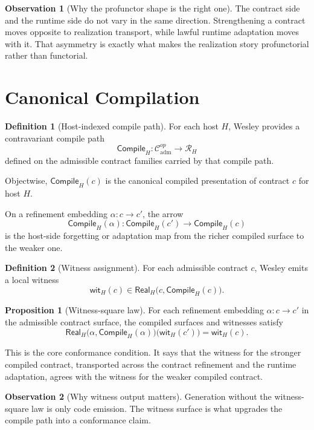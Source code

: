 \documentclass[11pt]{article}
\newcommand{\Ctr}{\mathcal{C}}
\newcommand{\RHost}[1]{\mathcal{R}_{#1}}
\newcommand{\Compile}{\mathsf{Compile}}
\newcommand{\Real}{\mathsf{Real}}
\theoremstyle{definition}
\newtheorem{definition}{Definition}
\newtheorem{observation}{Observation}
\newtheorem{proposition}{Proposition}
\begin{document}
\begin{observation}[Why the profunctor shape is the right one]
The contract side and the runtime side do not vary in the same direction.
Strengthening a contract moves opposite to realization transport, while lawful
runtime adaptation moves with it. That asymmetry is exactly what makes the
realization story profunctorial rather than functorial.
\end{observation}

\section{Canonical Compilation}

\begin{definition}[Host-indexed compile path]
For each host $H$, Wesley provides a contravariant compile path
\[
\Compile_H : \Ctr_{\mathrm{adm}}^{op} \to \RHost{H}
\]
defined on the admissible contract families carried by that compile path.
\end{definition}

Objectwise, $\Compile_H(c)$ is the canonical compiled presentation of contract
$c$ for host $H$.

On a refinement embedding $\alpha : c \to c'$, the arrow
\[
\Compile_H(\alpha) : \Compile_H(c') \to \Compile_H(c)
\]
is the host-side forgetting or adaptation map from the richer compiled surface
to the weaker one.

\begin{definition}[Witness assignment]
For each admissible contract $c$, Wesley emits a local witness
\[
\mathsf{wit}_H(c) \in \Real_H\bigl(c,\Compile_H(c)\bigr).
\]
\end{definition}

\begin{proposition}[Witness-square law]
For each refinement embedding $\alpha : c \to c'$ in the admissible contract
surface, the compiled surfaces and witnesses satisfy
\[
\Real_H\!\bigl(\alpha,\Compile_H(\alpha)\bigr)\bigl(\mathsf{wit}_H(c')\bigr)
= \mathsf{wit}_H(c).
\]
\end{proposition}

This is the core conformance condition. It says that the witness for the
stronger compiled contract, transported across the contract refinement and the
runtime adaptation, agrees with the witness for the weaker compiled contract.

\begin{observation}[Why witness output matters]
Generation without the witness-square law is only code emission. The witness
surface is what upgrades the compile path into a conformance claim.
\end{observation}
\end{document}
